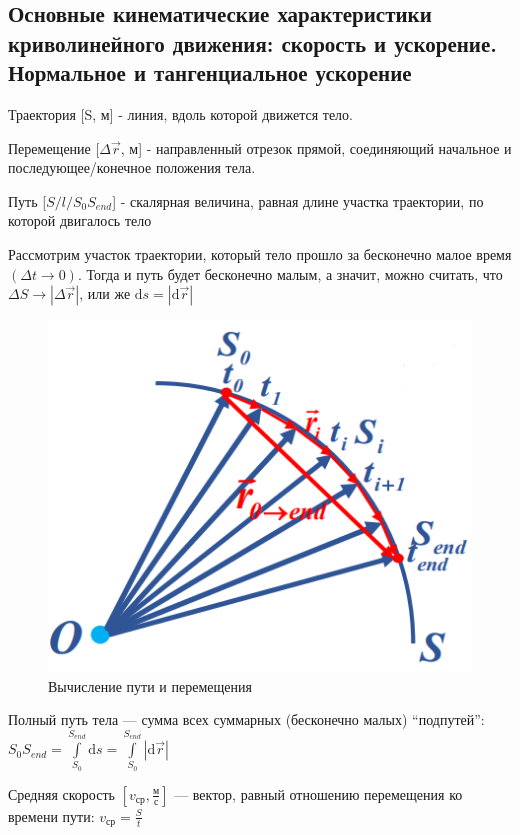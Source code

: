 \subsection{Основные кинематические характеристики криволинейного движения: скорость и ускорение. Нормальное и тангенциальное ускорение}

\begin{definition}
    Траектория [S, м] - линия, вдоль которой движется тело.
\end{definition}

\begin{definition}
    Перемещение [$\Delta\vec{r}$, м] - направленный отрезок прямой, соединяющий начальное и последующее/конечное положения тела.
\end{definition}

\begin{definition}
    Путь [$S/l/S_{0}S_{end}$] - скалярная величина, равная длине участка траектории, по которой двигалось тело
\end{definition}

Рассмотрим участок траектории, который тело прошло за бесконечно малое время $(\Delta t\to0)$. 
Тогда и путь будет бесконечно малым, а значит, можно считать, что $\Delta S\to|\Delta\vec r|$, 
или же $\mathrm{d}s=|\mathrm{d}\vec r|$

\begin{figure}[h]
    \centering
    \includegraphics[width=0.5\linewidth]{imgs/q1i1.png}
    \caption{Вычисление пути и перемещения}
    \label{q1i1}
\end{figure}

\begin{definition}
    Полный путь тела — сумма всех суммарных (бесконечно малых) “подпутей”: $S_0S_{end}=\int\limits_{S_0}^{S_{end}}\mathrm{d}s=\int\limits_{S_0}^{S_{end}}|\mathrm{d}\vec r|$
\end{definition}

\begin{definition}
    Средняя скорость $[v_{ср}, \frac{м}{с}]$ — вектор, равный отношению перемещения ко времени пути: $v_{ср} = \frac{S}{t}$
\end{definition}

